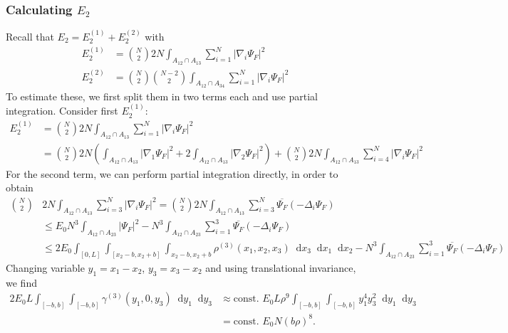 \documentclass[a4paper,11pt]{article}
\newcommand{\abs}[1]{\left\lvert #1 \right\rvert}
\newcommand*\diff{\mathop{}\!\mathrm{d}}
\numberwithin{equation}{section}
\begin{document}
		\subsubsection{Calculating $ E_2 $}
		Recall that $ E_2=E_2^{(1)}+E_2^{(2)} $ with \begin{equation}
		\begin{aligned}
		E_2^{(1)}&=\binom{N}{2}2N\int_{A_{12}\cap A_{13}}\sum_{i=1}^{N}\abs{\nabla_i\Psi_F}^2\\ E_2^{(2)}&=\binom{N}{2}\binom{N-2}{2}\int_{A_{12}\cap A_{34}}\sum_{i=1}^{N}\abs{\nabla_i\Psi_F}^2
		\end{aligned}
		\end{equation}
		To estimate these, we first split them in two terms each and use partial integration. Consider first $ E_2^{(1)} $: 
		\begin{equation}
		\begin{aligned}
		E_2^{(1)}&=\binom{N}{2}2N\int_{A_{12}\cap A_{13}}\sum_{i=1}^{N}\abs{\nabla_i\Psi_F}^2\\
		&=\binom{N}{2}2N\left(\int_{A_{12}\cap A_{13}}\abs{\nabla_1\Psi_F}^2+2\int_{A_{12}\cap A_{13}}\abs{\nabla_2\Psi_F}^2\right)+\binom{N}{2}2N\int_{A_{12}\cap A_{13}}\sum_{i=4}^{N}\abs{\nabla_i\Psi_F}^2
		\end{aligned}
		\end{equation}
		For the second term, we can perform partial integration directly, in order to obtain \begin{equation}
		\begin{aligned}
		\binom{N}{2}&2N\int_{A_{12}\cap A_{13}}\sum_{i=3}^{N}\abs{\nabla_i\Psi_F}^2=\binom{N}{2}2N\int_{A_{12}\cap A_{13}}\sum_{i=3}^{N}\overline{\Psi_F}(-\Delta_i\Psi_F)\\
		&\leq E_0 N^3\int_{A_{12}\cap A_{23}}\abs{\Psi_F}^2-N^3\int_{A_{12}\cap A_{23}}\sum_{i=1}^{3}\overline{\Psi_F}(-\Delta_i\Psi_F)\\&\leq 2E_0\int_{[0,L]}\int_{[x_2-b,x_2+b]}\int_{x_2-b,x_2+b}\rho^{(3)}(x_1,x_2,x_3)\diff x_3\diff x_1\diff x_2-N^3\int_{A_{12}\cap A_{23}}\sum_{i=1}^{3}\overline{\Psi_F}(-\Delta_i\Psi_F)
		\end{aligned}
		\end{equation}
		Changing variable $ y_1=x_1-x_2 $, $ y_3=x_3-x_2 $ and using translational invariance, we find \begin{equation}
		\begin{aligned}
		2E_0 L \int_{[-b,b]}\int_{[-b,b]}\gamma^{(3)}(y_1,0,y_3)\diff y_1\diff y_3&\approx \text{const. }E_0 L\rho^9  \int_{[-b,b]}\int_{[-b,b]}y_1^4y_3^2\diff y_1\diff y_3\\
		&=\text{const. }E_0 N(b\rho)^8.
		\end{aligned}
		\end{equation}
\end{document}
